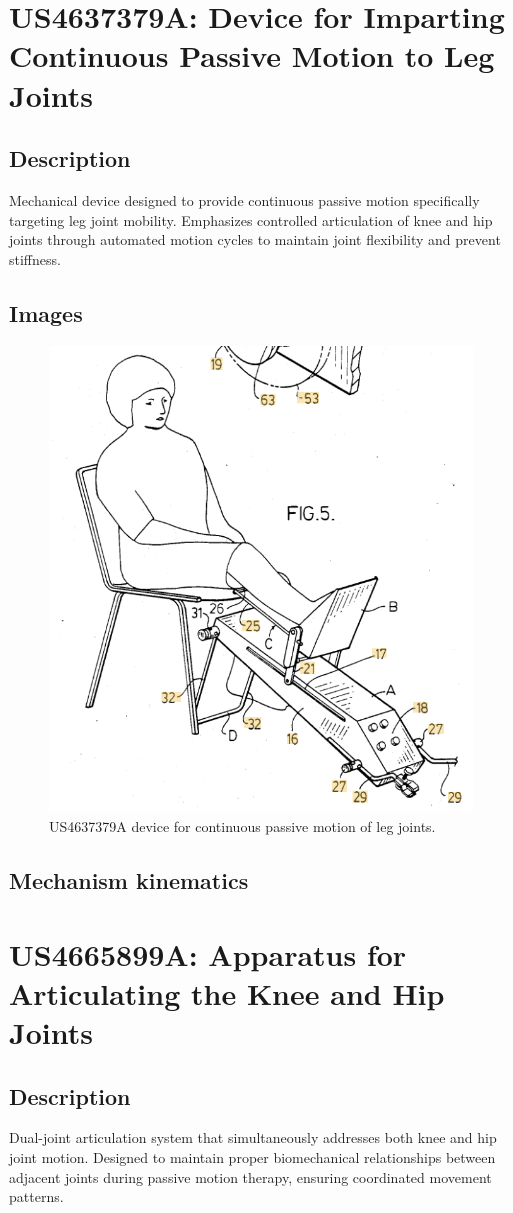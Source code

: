 \documentclass[11pt]{article}
\begin{document}
\section{US4637379A: Device for Imparting Continuous Passive Motion to Leg Joints}
\subsection{Description}
Mechanical device designed to provide continuous passive motion specifically targeting leg joint mobility. Emphasizes controlled articulation of knee and hip joints through automated motion cycles to maintain joint flexibility and prevent stiffness.
\subsection{Images}
\begin{figure}[H]
  \centering
  \includegraphics[width=0.54\linewidth]{US4637379A.png}
  \caption{US4637379A device for continuous passive motion of leg joints.}
  \label{fig:US4637379A}
\end{figure}

\subsection{Mechanism kinematics}

\section{US4665899A: Apparatus for Articulating the Knee and Hip Joints}
\subsection{Description}
Dual-joint articulation system that simultaneously addresses both knee and hip joint motion. Designed to maintain proper biomechanical relationships between adjacent joints during passive motion therapy, ensuring coordinated movement patterns.
\end{document}
